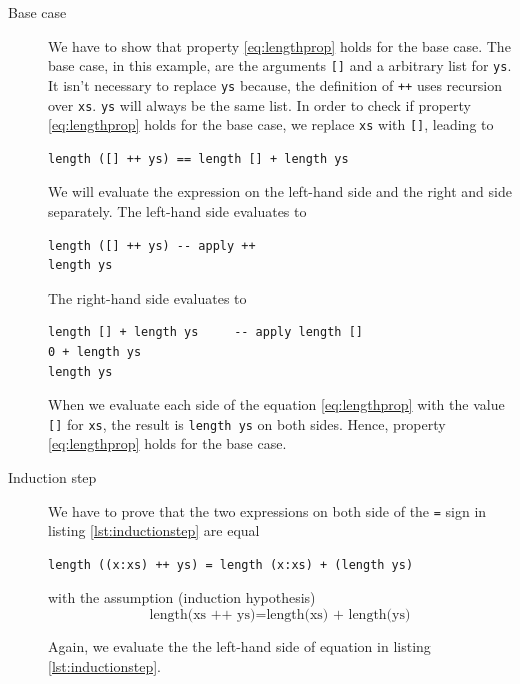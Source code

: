 \begin{description}
\item[Base case]
We have to show that property \ref{eq:lengthprop} holds for the base case. The base case, in this example, are the arguments \verb|[]| and a arbitrary list for \verb|ys|. It isn't necessary to replace \verb|ys| because, the definition of \verb|++| uses recursion over \verb|xs|. \verb|ys| will always be the same list.
In order to check if property \ref{eq:lengthprop} holds for the base case, we replace \verb|xs| with  \verb|[]|, leading to

\begin{verbatim}
length ([] ++ ys) == length [] + length ys
\end{verbatim}

We will evaluate the expression on the left-hand side and the right and side separately.
The left-hand side evaluates to

\begin{verbatim}
length ([] ++ ys) -- apply ++
length ys
\end{verbatim}

The right-hand side evaluates to 

\begin{verbatim}
length [] + length ys     -- apply length []
0 + length ys
length ys
\end{verbatim}

When we evaluate each side of the equation \ref{eq:lengthprop} with the value \verb|[]| for \verb|xs|, the result is \verb|length ys| on both sides. Hence, property \ref{eq:lengthprop} holds for the base case.

\item[Induction step]
 We have to prove that the two expressions on both side of the \verb|=| sign in listing \ref{lst:inductionstep} are equal
\begin{lstlisting}[caption={The left-hand side and the right-hand side have to be equal},label={lst:inductionstep}]
length ((x:xs) ++ ys) = length (x:xs) + (length ys)
\end{lstlisting}

with the assumption (induction hypothesis)
\begin{equation}
  \label{eq:induction_hypothesis}
      \text{length(xs ++ ys)} = \text{length(xs) + length(ys)}
\end{equation}

Again, we evaluate the the left-hand side of equation in listing \ref{lst:inductionstep}.


\end{description}
